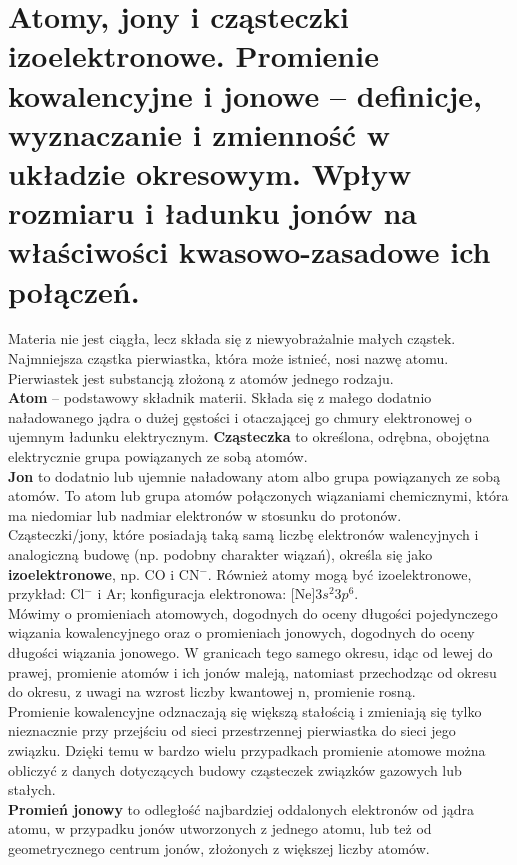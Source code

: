 \documentclass{article}
\begin{document}
\section{Atomy, jony i cząsteczki izoelektronowe. Promienie kowalencyjne i jonowe – definicje, wyznaczanie i zmienność w układzie okresowym. Wpływ rozmiaru i ładunku jonów na właściwości kwasowo-zasadowe ich połączeń.}

Materia nie jest ciągła, lecz składa się z niewyobrażalnie małych cząstek. Najmniejsza cząstka pierwiastka, która może istnieć, nosi nazwę atomu. Pierwiastek jest substancją złożoną z atomów jednego rodzaju. \\
\textbf{Atom} – podstawowy składnik materii. Składa się z małego dodatnio naładowanego jądra o dużej gęstości i otaczającej go chmury elektronowej o ujemnym ładunku elektrycznym.
\textbf{Cząsteczka} to określona, odrębna, obojętna elektrycznie grupa powiązanych ze sobą atomów. \\
\textbf{Jon} to dodatnio lub ujemnie naładowany atom albo grupa powiązanych ze sobą atomów. To atom lub grupa atomów połączonych wiązaniami chemicznymi, która ma niedomiar lub nadmiar elektronów w stosunku do protonów. \\
Cząsteczki/jony, które posiadają taką samą liczbę elektronów walencyjnych i analogiczną
budowę (np. podobny charakter wiązań), określa się jako \textbf{izoelektronowe}, np. CO i CN$^-$. Również atomy mogą być izoelektronowe, przykład: Cl$^-$ i Ar; konfiguracja elektronowa: [Ne]3$s^2$3$p^6$. \\
Mówimy o promieniach atomowych, dogodnych do oceny długości pojedynczego wiązania kowalencyjnego oraz o promieniach jonowych, dogodnych do oceny długości wiązania jonowego. W granicach tego samego okresu, idąc od lewej do prawej, promienie atomów i ich jonów maleją, natomiast przechodząc od okresu do okresu, z uwagi na wzrost liczby kwantowej n, promienie rosną. \\ 

Promienie kowalencyjne odznaczają się większą stałością i zmieniają się tylko nieznacznie przy przejściu od sieci przestrzennej pierwiastka do sieci jego związku. Dzięki temu w bardzo wielu przypadkach promienie atomowe można obliczyć z danych dotyczących budowy cząsteczek związków gazowych lub stałych. \\

\textbf{Promień jonowy} to odległość najbardziej oddalonych elektronów od jądra atomu, w przypadku jonów utworzonych z jednego atomu, lub też od geometrycznego centrum jonów, złożonych z większej liczby atomów.
\end{document}
